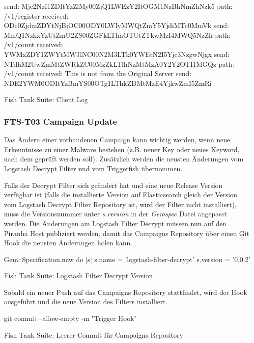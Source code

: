 \begin{listing}[H]
\begin{fancycode}
send: Mjc2NzI1ZDItYzZlMy00ZjQ1LWEzY2ItOGM1NzBhNmZhNzk5
path: /v1/register
received: ODc0ZjdmZDYtNjBjOC00ODY0LWIyMWQtZmY5YjdiMTc0MmVk
send: MmQ1NzkxYzUtZmU2ZS00ZGFkLTlmOTUtZTkwMzI4MWQ5NzZh
path: /v1/count
received: YWMxZDY1ZWYtMWJlNC00N2M3LTk0YWEtN2I5Yjc3NzgwNjgx
send: NTdhM2UwZmMtZWRkZC00MzZkLTlhNzMtMzA0Y2Y2OTI1MGQz
path: /v1/count
received: This is not from the Original Server
send: NDE2YWM0ODItYzBmYS00OTg1LThkZDMtMzE4YjkwZmI5ZmRi
\end{fancycode}
\caption{Fish Tank Suite: Client Log}
\label{lst:uri-client-log}
\end{listing}


\subsubsection{FTS-T03 Campaign Update}
Das Ändern einer vorhandenen Campaign kann wichtig werden, wenn neue Erkenntnisse zu einer Malware bestehen (z.B. neuer Key oder neues Keyword, nach dem geprüft werden soll).
Zusätzlich werden die neusten Änderungen vom Logstash Decrypt Filter und vom Triggerfish übernommen.

Falls der Decrypt Filter sich geändert hat und eine neue Release Version verfügbar ist (falls die installierte Version auf Elasticsearch gleich der Version vom Logstash Decrypt Filter Repository ist, wird der Filter nicht installiert), muss die Versionsnummer unter \textit{s.version} in der \textit{Gemspec} Datei angepasst werden.
Die Änderungen am Logstash Filter Decrypt müssen nun auf den Piranha Host publiziert werden, damit das Campaigns Repository über einen Git Hook die neusten Änderungen holen kann.

\begin{listing}[H]
\begin{rubycode}
Gem::Specification.new do |s|
  s.name = 'logstash-filter-decrypt'
  s.version = '0.0.2'
\end{rubycode}
\caption{Fish Tank Suite: Logstash Filter Decrypt Version}
\label{lst:logstash-filter-decrypt-version}
\end{listing}

Sobald ein neuer Push auf das Campaigns Repository stattfindet, wird der Hook ausgeführt und die neue Version des Filters installiert.

\begin{listing}[H]
\begin{fancycode}
git commit --allow-empty -m "Trigger Hook"
\end{fancycode}
\caption{Fish Tank Suite: Leerer Commit für Campaigns Repository}
\label{lst:empty-commit-campaigns}
\end{listing}

